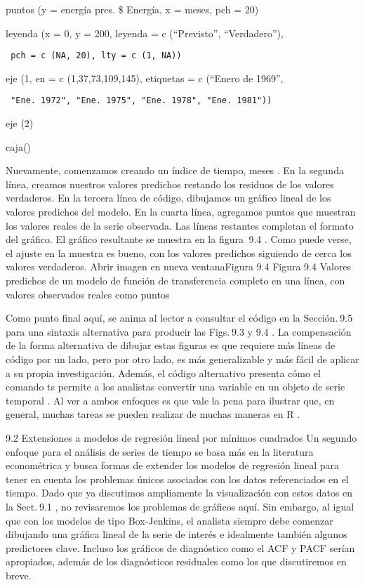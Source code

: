 \documentclass[
]{book}
\begin{document}
puntos (y = energía pres. \$ Energía, x = meses, pch = 20)

leyenda (x = 0, y = 200, leyenda = c (``Previsto'', ``Verdadero''),

\begin{verbatim}
 pch = c (NA, 20), lty = c (1, NA))
\end{verbatim}

eje (1, en = c (1,37,73,109,145), etiquetas = c (``Enero de 1969'',

\begin{verbatim}
 "Ene. 1972", "Ene. 1975", "Ene. 1978", "Ene. 1981"))
\end{verbatim}

eje (2)

caja()

Nuevamente, comenzamos creando un índice de tiempo, meses . En la segunda línea, creamos nuestros valores predichos restando los residuos de los valores verdaderos. En la tercera línea de código, dibujamos un gráfico lineal de los valores predichos del modelo. En la cuarta línea, agregamos puntos que muestran los valores reales de la serie observada. Las líneas restantes completan el formato del gráfico. El gráfico resultante se muestra en la figura  9.4 . Como puede verse, el ajuste en la muestra es bueno, con los valores predichos siguiendo de cerca los valores verdaderos.
Abrir imagen en nueva ventanaFigura 9.4
Figura 9.4
Valores predichos de un modelo de función de transferencia completo en una línea, con valores observados reales como puntos

Como punto final aquí, se anima al lector a consultar el código en la Sección. 9.5 para una sintaxis alternativa para producir las Figs. 9.3 y 9.4 . La compensación de la forma alternativa de dibujar estas figuras es que requiere más líneas de código por un lado, pero por otro lado, es más generalizable y más fácil de aplicar a su propia investigación. Además, el código alternativo presenta cómo el comando ts permite a los analistas convertir una variable en un objeto de serie temporal . Al ver a ambos enfoques es que vale la pena para ilustrar que, en general, muchas tareas se pueden realizar de muchas maneras en R .

9.2 Extensiones a modelos de regresión lineal por mínimos cuadrados
Un segundo enfoque para el análisis de series de tiempo se basa más en la literatura econométrica y busca formas de extender los modelos de regresión lineal para tener en cuenta los problemas únicos asociados con los datos referenciados en el tiempo. Dado que ya discutimos ampliamente la visualización con estos datos en la Sect. 9.1 , no revisaremos los problemas de gráficos aquí. Sin embargo, al igual que con los modelos de tipo Box-Jenkins, el analista siempre debe comenzar dibujando una gráfica lineal de la serie de interés e idealmente también algunos predictores clave. Incluso los gráficos de diagnóstico como el ACF y PACF serían apropiados, además de los diagnósticos residuales como los que discutiremos en breve.
\end{document}
